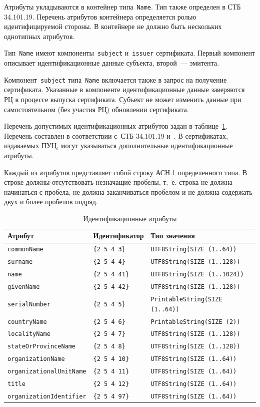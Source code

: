 Атрибуты укладываются в контейнер типа~\texttt{Name}. Тип также определен в 
СТБ 34.101.19. Перечень атрибутов контейнера определяется ролью идентифицируемой 
стороны. В контейнере не должно быть нескольких однотипных атрибутов.

Тип~\texttt{Name} имеют компоненты~\texttt{subject} и~\texttt{issuer} 
сертификата. Первый компонент описывает идентификационные данные субъекта, 
второй~--- эмитента.

Компонент~\texttt{subject} типа~\texttt{Name} включается также в запрос на 
получение сертификата. Указанные в компоненте идентификационные данные
заверяются РЦ в процессе выпуска сертификата. Субъект не может изменить 
данные при самостоятельном (без участия РЦ) обновлении сертификата. 

Перечень допустимых идентификационных атрибутов задан в 
таблице~\ref{Table.ENTITIES.Attrs}. Перечень составлен в соответствии 
с~СТБ 34.101.19 и~\cite{X520}. 
%
В сертификатах, издаваемых ПУЦ, могут указываться дополнительные  
идентификационные атрибуты.

Каждый из атрибутов представляет собой строку АСН.1 определенного типа. 
В строке должны отсутствовать незначащие пробелы, т.~е. строка не должна начинаться 
с пробела, не должна заканчиваться пробелом и не должна содержать двух и 
более пробелов подряд.

\begin{table}[bht]
\caption{Идентификационные атрибуты}
\label{Table.ENTITIES.Attrs}
\begin{tabular}{|l|l|l|}
\hline
Атрибут & Идентификатор & Тип значения\\
\hline
\hline
\texttt{commonName} & \verb|{2 5 4 3}| & \texttt{UTF8String(SIZE (1..64))}\\
\texttt{surname} & \verb|{2 5 4 4}| & \texttt{UTF8String(SIZE (1..128))}\\
\texttt{name} & \verb|{2 5 4 41}| & \texttt{UTF8String(SIZE (1..1024))}\\
\texttt{givenName} & \verb|{2 5 4 42}| & \texttt{UTF8String(SIZE (1..128))}\\
\texttt{serialNumber} & \verb|{2 5 4 5}| & \texttt{PrintableString(SIZE (1..64))}\\
\texttt{countryName} & \verb|{2 5 4 6}| & \texttt{PrintableString(SIZE (2))}\\
\texttt{localityName} & \verb|{2 5 4 7}| & \texttt{UTF8String(SIZE (1..128))}\\
\texttt{stateOrProvinceName} & \verb|{2 5 4 8}| & \texttt{UTF8String(SIZE (1..128))}\\
\texttt{organizationName} & \verb|{2 5 4 10}| & \texttt{UTF8String(SIZE (1..64))}\\
\texttt{organizationalUnitName} & \verb|{2 5 4 11}| & \texttt{UTF8String(SIZE (1..64))}\\
\texttt{title} & \verb|{2 5 4 12}| & \texttt{UTF8String(SIZE (1..64))}\\
\texttt{organizationIdentifier} & \verb|{2 5 4 97}| & \texttt{UTF8String(SIZE (1..64))}\\
\hline                                      
\end{tabular}
\end{table}

